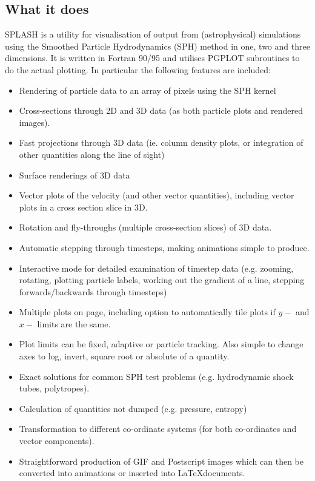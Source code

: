 \documentclass[a4paper,11pt]{article}
\begin{document}
\subsection{What it does}
SPLASH is a utility for visualisation of output from (astrophysical) simulations using the
Smoothed Particle Hydrodynamics (SPH) method in one, two and three dimensions.
It is written in Fortran 90/95 and
utilises PGPLOT subroutines to do the actual plotting. In particular the following
features are included:
\begin{itemize}
\item Rendering of particle data to an array of pixels using the SPH kernel
\item Cross-sections through 2D and 3D data (as both particle plots and rendered
images).
\item Fast projections through 3D data (ie. column density plots, or integration of
other quantities along the line of sight)
\item Surface renderings of 3D data
\item Vector plots of the velocity (and other vector quantities), including vector
plots in a cross section slice in 3D.
\item Rotation and fly-throughs (multiple cross-section slices) of 3D data.
\item Automatic stepping through timesteps, making animations simple to produce.
\item Interactive mode for detailed examination of timestep data (e.g. zooming,
rotating, plotting particle labels, working out the gradient of a line, stepping forwards/backwards
through timesteps)
\item Multiple plots on page, including option to automatically tile plots if $y-$ and $x-$ limits
are the same.
\item Plot limits can be fixed, adaptive or particle tracking. Also simple to change
axes to log, invert, square root or absolute of a quantity.
\item Exact solutions for common SPH test problems (e.g. hydrodynamic shock tubes,
polytropes).
\item Calculation of quantities not dumped (e.g. pressure, entropy)
\item Transformation to different co-ordinate systems (for both co-ordinates and
vector components).
\item Straightforward production of GIF and Postscript images which can then be
converted into animations or inserted into \LaTeX documents.
\end{itemize}
\end{document}
